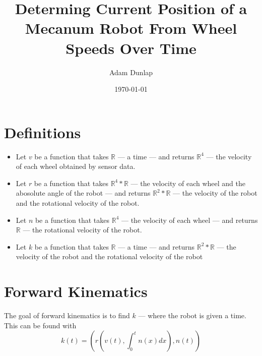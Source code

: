 \documentclass{article}
\begin{document}
\title{Determing Current Position of a Mecanum Robot From Wheel Speeds Over Time}
\author{Adam Dunlap}
\date{\today}
\maketitle

\section{Definitions}
\begin{itemize}
\item Let $v$ be a function that takes $\mathbb{R}$ --- a time --- and returns $\mathbb{R}^4$ --- the velocity of each wheel obtained by sensor data.

\item Let $r$ be a function that takes $\mathbb{R}^4 * \mathbb{R}$ --- the velocity of each wheel and the abosolute angle of the robot --- and returns $\mathbb{R}^2 * \mathbb{R}$ --- the velocity of the robot and the rotational velocity of the robot.

\item Let $n$ be a function that takes $\mathbb{R}^4$ --- the velocity of each wheel --- and returns $\mathbb{R}$ --- the rotational velocity of the robot.

\item Let $k$ be a function that takes $\mathbb{R}$ --- a time --- and returns $\mathbb{R}^2 * \mathbb{R}$ --- the velocity of the robot and the rotational velocity of the robot

\end{itemize}

\section{Forward Kinematics}
The goal of forward kinematics is to find $k$ --- where the robot is given a time. This can be found with
\[
k(t) = \left(r\left(v\left(t\right), \int_0^t n\left(x\right) dx\right), n\left(t\right)\right)
\]
\end{document}
